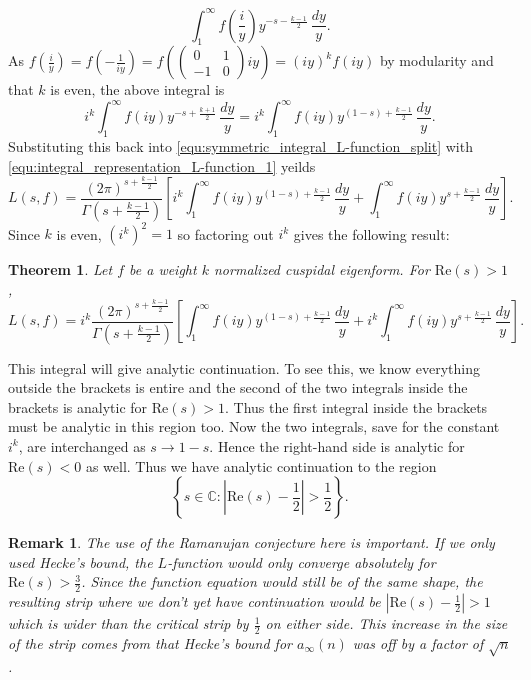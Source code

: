 \documentclass[12pt]{book}
\newtheorem{theorem}{Theorem}[section]
\newtheorem{remark}{Remark}[section]
\theoremstyle{definition}\newframedtheorem{method}{Method}
\newcommand{\C}{\mathbb{C}}
\newcommand{\G}{\Gamma}
\newcommand{\<}{\langle}
\renewcommand{\>}{\rangle}
\renewcommand{\Re}{\mathrm{Re}}
\begin{document}
      \[
        \int_{1}^{\infty}f\left(\frac{i}{y}\right)y^{-s-\frac{k-1}{2}}\,\frac{dy}{y}.
      \]
      As $f\left(\frac{i}{y}\right) = f\left(-\frac{1}{iy}\right) = f\left(\begin{pmatrix} 0 & 1 \\ -1 & 0 \end{pmatrix}iy\right) = (iy)^{k}f(iy)$ by modularity and that $k$ is even, the above integral is
      \[
        i^{k}\int_{1}^{\infty}f(iy)y^{-s+\frac{k+1}{2}}\,\frac{dy}{y} = i^{k}\int_{1}^{\infty}f(iy)y^{(1-s)+\frac{k-1}{2}}\,\frac{dy}{y}.
      \]
      Substituting this back into \cref{equ:symmetric_integral_L-function_split} with \cref{equ:integral_representation_L-function_1} yeilds
      \[
        L(s,f) = \frac{(2\pi)^{s+\frac{k-1}{2}}}{\G(s+\frac{k-1}{2})}\left[i^{k}\int_{1}^{\infty}f(iy)y^{(1-s)+\frac{k-1}{2}}\,\frac{dy}{y}+\int_{1}^{\infty}f(iy)y^{s+\frac{k-1}{2}}\,\frac{dy}{y}\right].
      \]
      Since $k$ is even, $(i^{k})^{2} = 1$ so factoring out $i^{k}$ gives the following result:

      \begin{theorem}
        Let $f$ be a weight $k$ normalized cuspidal eigenform. For $\Re(s) > 1$,
        \[
          L(s,f) = i^{k}\frac{(2\pi)^{s+\frac{k-1}{2}}}{\G(s+\frac{k-1}{2})}\left[\int_{1}^{\infty}f(iy)y^{(1-s)+\frac{k-1}{2}}\,\frac{dy}{y}+i^{k}\int_{1}^{\infty}f(iy)y^{s+\frac{k-1}{2}}\,\frac{dy}{y}\right].
        \]
      \end{theorem}

      This integral will give analytic continuation. To see this, we know everything outside the brackets is entire and the second of the two integrals inside the brackets is analytic for $\Re(s) > 1$. Thus the first integral inside the brackets must be analytic in this region too. Now the two integrals, save for the constant $i^{k}$, are interchanged as $s \to 1-s$. Hence the right-hand side is analytic for $\Re(s) < 0$ as well. Thus we have analytic continuation to the region
      \[
        \left\{s \in \C:\left|\Re(s)-\frac{1}{2}\right| > \frac{1}{2}\right\}.
      \]

      \begin{remark}
        The use of the Ramanujan conjecture here is important. If we only used Hecke's bound, the $L$-function would only converge absolutely for $\Re(s) > \frac{3}{2}$. Since the function equation would still be of the same shape, the resulting strip where we don't yet have continuation would be $|\Re(s)-\frac{1}{2}| > 1$ which is wider than the critical strip by $\frac{1}{2}$ on either side. This increase in the size of the strip comes from that Hecke's bound for $a_{\infty}(n)$ was off by a factor of $\sqrt{n}$.
      \end{remark}
\end{document}
